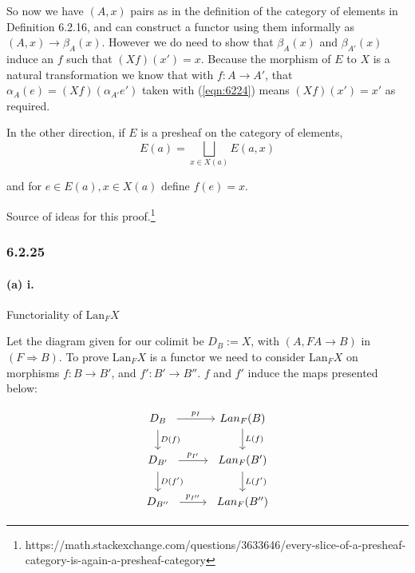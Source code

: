 \documentclass{article}
\begin{document}
So now we have $(A, x)$ pairs as in the definition of the category of elements in Definition 6.2.16, and can construct a functor using them informally as $(A, x) \rightarrow  \beta_A(x)$. However we do need to show that $\beta_A(x)$ and $\beta_{A'}(x)$ induce an $f$ such that $(Xf)(x')=x$. Because the morphism of $E$ to $X$ is a natural transformation we know that with $f\colon A \rightarrow A'$, that $\alpha_A(e) = (Xf)(\alpha_{A'}e')$ taken with (\ref{eqn:6224}) means $(Xf)(x')= x'$ as required.

In the other direction, if $E$ is a presheaf on the category of elements,
\begin{equation}
  E(a) = \bigsqcup_{x \in X(a)}E(a,x)
\end{equation}

and for $e \in E(a), x \in X(a)$ define $f(e) = x$.

Source of ideas for this proof.\footnote{https://math.stackexchange.com/questions/3633646/every-slice-of-a-presheaf-category-is-again-a-presheaf-category}

\subsubsection*{6.2.25}

\paragraph{(a) i.}
Functoriality of $\text{Lan}_FX$

Let the diagram given for our colimit be $D_B:= X$, with $(A, FA \rightarrow B)$ in $\left(F \Rightarrow B\right)$. To prove $\text{Lan}_FX$ is a functor we need to consider $\text{Lan}_FX$ on morphisms $f\colon B \rightarrow B'$, and $f'\colon B' \rightarrow B''$. $f$ and $f'$ induce the maps presented below:

\begin{equation}
  \label{eqn:5391}
  \begin{tikzcd}
    \begin{array}{c}
      D_B \\
    \end{array}
    \arrow[r, "p_I"] \arrow[d, "D(f)"]
    & Lan_F(B) \arrow[d, "L(f)"] \\
    \begin{array}{c}
      D_{B'}
    \end{array}
    \arrow[r, "p_{I'}"] \arrow[d, "D(f')"]
    &
    \begin{array}{c}
      Lan_F(B') \arrow[d, "L(f')"]
    \end{array} \\
    \begin{array}{c}
      D_{B''}
    \end{array}
    \arrow[r, "p_{I''}"]
    &
    \begin{array}{c}
     Lan_F(B'')
    \end{array}
  \end{tikzcd}
\end{equation}
\end{document}

